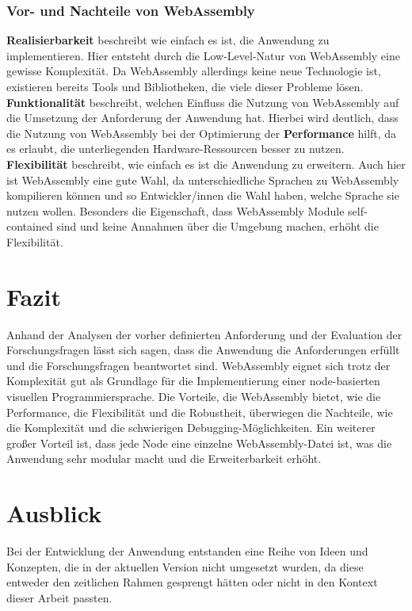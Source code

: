 \documentclass[ngerman]{article}
\begin{document}
\subsubsection{Vor- und Nachteile von WebAssembly}
\textbf{Realisierbarkeit} beschreibt wie einfach es ist, die Anwendung zu implementieren. Hier entsteht durch die Low-Level-Natur von WebAssembly eine gewisse Komplexität. 
Da WebAssembly allerdings keine neue Technologie ist, existieren bereits Tools und Bibliotheken, die viele dieser Probleme lösen.
\br
\textbf{Funktionalität} beschreibt, welchen Einfluss die Nutzung von WebAssembly auf die Umsetzung der Anforderung der Anwendung hat. Hierbei wird deutlich, dass die Nutzung von WebAssembly bei der Optimierung der \textbf{Performance} hilft, da es erlaubt, die unterliegenden Hardware-Ressourcen besser zu nutzen.
\br
\textbf{Flexibilität} beschreibt, wie einfach es ist die Anwendung zu erweitern. Auch hier ist WebAssembly eine gute Wahl, da unterschiedliche Sprachen zu WebAssembly kompilieren können und so Entwickler/innen die Wahl haben, welche Sprache sie nutzen wollen. Besonders die Eigenschaft, dass WebAssembly Module self-contained sind und keine Annahmen über die Umgebung machen, erhöht die Flexibilität.

\section{Fazit}
Anhand der Analysen der vorher definierten Anforderung und der Evaluation der Forschungsfragen lässt sich sagen, dass die Anwendung die Anforderungen erfüllt und die Forschungsfragen beantwortet sind.
\br
WebAssembly eignet sich trotz der Komplexität gut als Grundlage für die Implementierung einer node-basierten visuellen Programmiersprache. Die Vorteile, die WebAssembly bietet, wie die Performance, die Flexibilität und die Robustheit, überwiegen die Nachteile, wie die Komplexität und die schwierigen Debugging-Möglichkeiten. Ein weiterer großer Vorteil ist, dass jede Node eine einzelne WebAssembly-Datei ist, was die Anwendung sehr modular macht und die Erweiterbarkeit erhöht.

\section{Ausblick}
Bei der Entwicklung der Anwendung entstanden eine Reihe von Ideen und Konzepten, die in der aktuellen Version nicht umgesetzt wurden, da 
diese entweder den zeitlichen Rahmen gesprengt hätten oder nicht in den Kontext dieser Arbeit passten.
\end{document}
